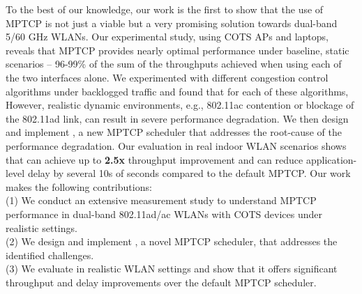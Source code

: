 To the best of our knowledge, our work is the first to show that the
use of MPTCP is not just a viable but a very promising solution
towards dual-band 5/60 GHz WLANs.
Our experimental study, using COTS APs and laptops, reveals that 
MPTCP provides nearly optimal performance under baseline, static scenarios -- 96-99\% of the sum of the throughputs achieved when using each of the two interfaces alone.
We experimented with 
different congestion control algorithms 
under backlogged
traffic and found that for each of 
these
algorithms, 
\fi
However, realistic dynamic environments, e.g., 802.11ac contention or 
blockage of the 802.11ad link, 
can result in severe performance degradation. We then design and implement \name, a new
MPTCP scheduler that addresses the root-cause of the performance
degradation.
\fi
Our evaluation in real
indoor WLAN scenarios shows that \name can achieve up to \textbf{2.5x}
throughput improvement and can reduce application-level delay by several
10s of seconds compared to the default MPTCP.
\fi
Our work makes the following contributions:
\\
(1) We conduct an extensive measurement study to understand MPTCP
performance in dual-band 802.11ad/ac WLANs with COTS devices under
realistic settings.
\\
(2) We design and implement \name, a novel MPTCP scheduler, that
addresses the identified challenges.
\\
(3) We evaluate \name in realistic WLAN settings and show that it
offers significant throughput and delay improvements over the default
MPTCP scheduler.
\fi
